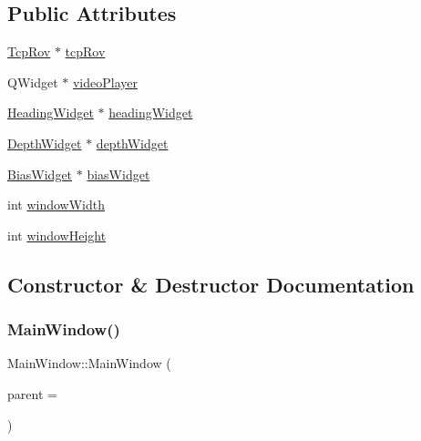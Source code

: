\subsection*{Public Attributes}
\begin{DoxyCompactItemize}
\item 
\mbox{\hyperlink{class_tcp_rov}{Tcp\+Rov}} $\ast$ \mbox{\hyperlink{class_main_window_a7006af59fdc693b8b3b465b4765cf963}{tcp\+Rov}}
\item 
Q\+Widget $\ast$ \mbox{\hyperlink{class_main_window_a3adf86de532933a431d3c455ca69ead2}{video\+Player}}
\item 
\mbox{\hyperlink{class_heading_widget}{Heading\+Widget}} $\ast$ \mbox{\hyperlink{class_main_window_afc1e7d28fa0ca38c597d040e01cc6b8a}{heading\+Widget}}
\item 
\mbox{\hyperlink{class_depth_widget}{Depth\+Widget}} $\ast$ \mbox{\hyperlink{class_main_window_a5b012373e6e8cf8777be269e022734ed}{depth\+Widget}}
\item 
\mbox{\hyperlink{class_bias_widget}{Bias\+Widget}} $\ast$ \mbox{\hyperlink{class_main_window_a0a61c67af3eb8bdc182d76932c1e1974}{bias\+Widget}}
\item 
int \mbox{\hyperlink{class_main_window_aea07048eb175eb5ba13887bb5fb23d3e}{window\+Width}}
\item 
int \mbox{\hyperlink{class_main_window_a7bc7703ecfb3fbf19c202e37cbd21478}{window\+Height}}
\end{DoxyCompactItemize}


\subsection{Constructor \& Destructor Documentation}
\mbox{\label{class_main_window_a8b244be8b7b7db1b08de2a2acb9409db}} 
\subsubsection{\texorpdfstring{Main\+Window()}{MainWindow()}}
{\footnotesize\ttfamily Main\+Window\+::\+Main\+Window (\begin{DoxyParamCaption}\item[{Q\+Widget $\ast$}]{parent = {} }\end{DoxyParamCaption})\hspace{0.3cm}{\ttfamily [explicit]}}

